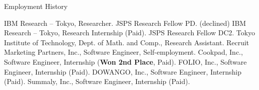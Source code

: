 \begin{rubric}{Employment History}

  \entry*[2023.04 -- now] IBM Research -- Tokyo, Researcher.
  \entry*[2023.04 -- 2023.4] JSPS Research Fellow PD. (declined)
  \entry*[2021.08 -- 2021.10] IBM Research -- Tokyo, Research Internship (Paid).
  \entry*[2021.04 -- 2023.3] JSPS Research Fellow DC2.
  \entry*[2020.11 -- 2023.3] Tokyo Institute of Technology, Dept. of Math. and Comp.,
  Research Assistant.
  \entry*[2018.6 -- 2019.2] Recruit Marketing Partners, Inc., Software Engineer,
  Self-employment.
  \entry*[2018.8] Cookpad, Inc., Software Engineer, Internship (\textbf{Won 2nd
    Place}, Paid).
  \entry*[2017.4 -- 2018.3] FOLIO, Inc., Software Engineer, Internship (Paid).
  \entry*[2016.8 -- 2017.3] DOWANGO, Inc., Software Engineer, Internship (Paid).
  \entry*[2016.1 -- 2016.6] Summaly, Inc., Software Engineer, Internship (Paid).
%
\end{rubric}
